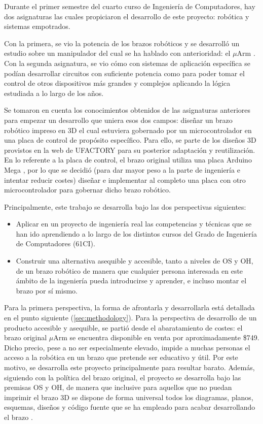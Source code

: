 Durante el primer semestre del cuarto curso de Ingeniería de Computadores,
hay dos asignaturas las cuales propiciaron el desarrollo de este proyecto: robótica
y sistemas empotrados.

Con la primera, se vio la potencia de los brazos robóticos y se desarrolló un estudio
sobre un manipulador del cual se ha hablado con anterioridad: el $\mu$Arm \cite{UPMRoboticsUarm2019b}.
Con la segunda asignatura, se vio cómo con sistemas de aplicación específica se podían
desarrollar circuitos con suficiente potencia como para poder tomar el control de otros
dispositivos más grandes y complejos aplicando la lógica estudiada a lo largo de los
años.

Se tomaron en cuenta los conocimientos obtenidos de las asignaturas anteriores
para empezar un desarrollo que uniera esos dos campos: diseñar un brazo robótico
impreso en 3D el cual estuviera gobernado por un microcontrolador en una placa de
control de propósito específico. Para ello, se parte de los diseños 3D provistos
en la web de UFACTORY \cite{UFACTORYXArmTextbackslashtextbaruArm} para su posterior
adaptación y reutilización. En lo referente a la placa de control, el brazo original
utiliza una placa Arduino Mega \cite{ArduinoMega2560}, por lo que se decidió (para dar
mayor peso a la parte de ingeniería e intentar reducir costes) diseñar e implementar al completo una placa con
otro microcontrolador para gobernar dicho brazo robótico.

Principalmente, este trabajo se desarrolla bajo las dos perspectivas siguientes:
\begin{itemize}
    \item Aplicar en un proyecto de ingeniería real las competencias y técnicas que 
    se han ido aprendiendo a lo largo de los distintos cursos del Grado de Ingeniería
    de Computadores (61CI).
    \item Construir una alternativa asequible y accesible, tanto a niveles de \ac{OS} y
    \ac{OH}, de un brazo robótico de manera que cualquier persona interesada en este
    ámbito de la ingeniería pueda introducirse y aprender, e incluso montar el brazo
    por sí mismo.
\end{itemize}

Para la primera perspectiva, la forma de afrontarla y desarrollarla está detallada en el
punto siguiente (\ref{sec:methodology}). Para la perspectiva de desarrollo de un
producto accesible y asequible, se partió desde el abaratamiento de costes: el brazo
original $\mu$Arm se encuentra disponible en venta por aproximadamente \$749. Dicho precio,
pese a no ser especialmente elevado, impide a muchas personas el acceso a la robótica
en un brazo que pretende ser educativo y útil. Por este motivo, se desarrolla este proyecto
principalmente para resultar barato. Además, siguiendo con la política del brazo
original, el proyecto se desarrolla bajo las premisas \ac{OS} y \ac{OH}, de manera que
inclusive para aquellos que no puedan imprimir el brazo 3D se dispone de forma universal
todos los diagramas, planos, esquemas, diseños y código fuente que se ha empleado para
acabar desarrollando el brazo \pArm{}.
